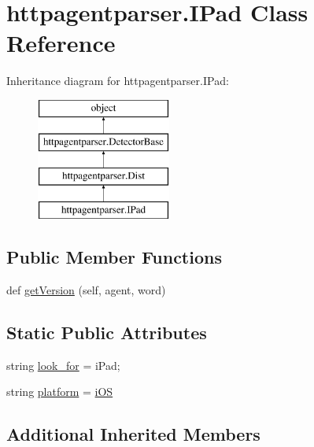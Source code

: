 \hypertarget{classhttpagentparser_1_1_i_pad}{}\section{httpagentparser.\+I\+Pad Class Reference}
\label{classhttpagentparser_1_1_i_pad}
Inheritance diagram for httpagentparser.\+I\+Pad\+:\begin{figure}[H]
\begin{center}
\leavevmode
\includegraphics[height=4.000000cm]{classhttpagentparser_1_1_i_pad}
\end{center}
\end{figure}
\subsection*{Public Member Functions}
\begin{DoxyCompactItemize}
\item 
def \hyperlink{classhttpagentparser_1_1_i_pad_abfa4759cb8824c2088a828e40f700381}{get\+Version} (self, agent, word)
\end{DoxyCompactItemize}
\subsection*{Static Public Attributes}
\begin{DoxyCompactItemize}
\item 
string \hyperlink{classhttpagentparser_1_1_i_pad_ac3081b11a94a968d144c8c8622fbcb72}{look\+\_\+for} = \textquotesingle{}i\+Pad;\textquotesingle{}
\item 
string \hyperlink{classhttpagentparser_1_1_i_pad_a900ab262d2c0ba7bf95925ecf94dd454}{platform} = \textquotesingle{}\hyperlink{classhttpagentparser_1_1i_o_s}{i\+OS}\textquotesingle{}
\end{DoxyCompactItemize}
\subsection*{Additional Inherited Members}


